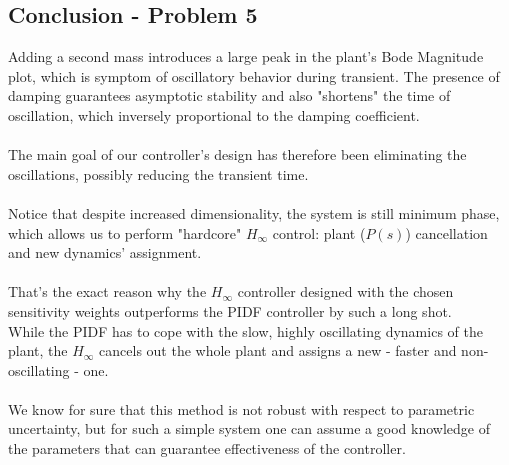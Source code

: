\documentclass[a4paper, 12pt]{article}
\begin{document}
\subsection{Conclusion - Problem 5}
Adding a second mass introduces a large peak in the plant's Bode Magnitude plot, which is symptom of oscillatory behavior during transient. The presence of damping guarantees asymptotic stability and also "shortens" the time of oscillation, which inversely proportional to the damping coefficient. 
\\\\The main goal of our controller's design has therefore been eliminating the oscillations, possibly reducing the transient time.\\
\\Notice that despite increased dimensionality, the system is still minimum phase, which allows us to perform "hardcore" $H_\infty$ control: plant ($P(s)$) cancellation and new dynamics' assignment.
\\ \\
That's the exact reason why the $H_\infty$ controller designed with the chosen sensitivity weights outperforms the PIDF controller by such a long shot. \\While the PIDF has to cope with the slow, highly oscillating dynamics of the plant, the $H_\infty$ cancels out the whole plant and assigns a new - faster and non-oscillating - one.
\\\\
We know for sure that this method is not robust with respect to parametric uncertainty, but for such a simple system one can assume a good knowledge of the parameters that can guarantee effectiveness of the controller.
\end{document}
